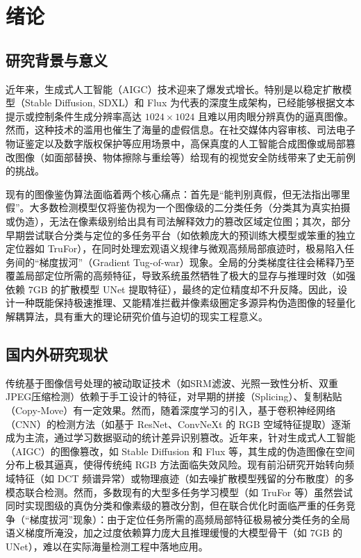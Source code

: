 \documentclass[UTF8, a4paper, 12pt]{ctexrep}
\begin{document}
\newpage
\tableofcontents
\newpage

\chapter{绪论}

\section{研究背景与意义}
近年来，生成式人工智能（AIGC）技术迎来了爆发式增长。特别是以稳定扩散模型（Stable Diffusion, SDXL）和 Flux 为代表的深度生成架构，已经能够根据文本提示或控制条件生成分辨率高达 $1024 \times 1024$ 且难以用肉眼分辨真伪的逼真图像。然而，这种技术的滥用也催生了海量的虚假信息。在社交媒体内容审核、司法电子物证鉴定以及数字版权保护等应用场景中，高保真度的人工智能合成图像或局部篡改图像（如面部替换、物体擦除与重绘等）给现有的视觉安全防线带来了史无前例的挑战。

现有的图像鉴伪算法面临着两个核心痛点：首先是“能判别真假，但无法指出哪里假”。大多数检测模型仅将鉴伪视为一个图像级的二分类任务（分类其为真实拍摄或伪造），无法在像素级别给出具有司法解释效力的篡改区域定位图；其次，部分早期尝试联合分类与定位的多任务平台（如依赖庞大的预训练大模型或笨重的独立定位器如 TruFor），在同时处理宏观语义规律与微观高频局部痕迹时，极易陷入任务间的“梯度拔河”（Gradient Tug-of-war）现象。全局的分类梯度往往会稀释乃至覆盖局部定位所需的高频特征，导致系统虽然牺牲了极大的显存与推理时效（如强依赖 $7\text{GB}$ 的扩散模型 UNet 提取特征），最终的定位精度却不升反降。因此，设计一种既能保持极速推理、又能精准拦截并像素级圈定多源异构伪造图像的轻量化解耦算法，具有重大的理论研究价值与迫切的现实工程意义。

\section{国内外研究现状}
传统基于图像信号处理的被动取证技术（如SRM滤波、光照一致性分析、双重JPEG压缩检测）依赖于手工设计的特征，对早期的拼接（Splicing）、复制粘贴（Copy-Move）有一定效果。然而，随着深度学习的引入，基于卷积神经网络（CNN）的检测方法（如基于 ResNet、ConvNeXt 的 RGB 空域特征提取）逐渐成为主流，通过学习数据驱动的统计差异识别篡改。近年来，针对生成式人工智能（AIGC）的图像篡改，如 Stable Diffusion 和 Flux 等，其生成的伪造图像在空间分布上极其逼真，使得传统纯 RGB 方法面临失效风险。现有前沿研究开始转向频域特征（如 DCT 频谱异常）或物理痕迹（如去噪扩散模型残留的分布散度）的多模态联合检测。然而，多数现有的大型多任务学习模型（如 TruFor 等）虽然尝试同时实现图级的真伪分类和像素级的篡改分割，但在联合优化时面临严重的任务竞争（“梯度拔河”现象）：由于定位任务所需的高频局部特征极易被分类任务的全局语义梯度所淹没，加之过度依赖算力庞大且推理缓慢的大模型骨干（如 $7\text{GB}$ 的 UNet），难以在实际海量检测工程中落地应用。
\end{document}

